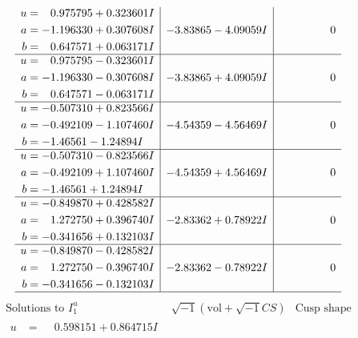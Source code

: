 \documentclass[1p]{elsarticle_modified}
\theoremstyle{definition}
\newcommand{\I}{\sqrt{-1}}
\begin{document}
$$\begin{array}{c|c|c}
\begin{aligned}
u &= \phantom{-}0.975795 + 0.323601 I \\
a &= -1.196330 + 0.307608 I \\
b &= \phantom{-}0.647571 + 0.063171 I\end{aligned}
 & -3.83865 - 4.09059 I & \phantom{-0.000000 } 0 \\ \hline\begin{aligned}
u &= \phantom{-}0.975795 - 0.323601 I \\
a &= -1.196330 - 0.307608 I \\
b &= \phantom{-}0.647571 - 0.063171 I\end{aligned}
 & -3.83865 + 4.09059 I & \phantom{-0.000000 } 0 \\ \hline\begin{aligned}
u &= -0.507310 + 0.823566 I \\
a &= -0.492109 - 1.107460 I \\
b &= -1.46561 - 1.24894 I\end{aligned}
 & -4.54359 - 4.56469 I & \phantom{-0.000000 } 0 \\ \hline\begin{aligned}
u &= -0.507310 - 0.823566 I \\
a &= -0.492109 + 1.107460 I \\
b &= -1.46561 + 1.24894 I\end{aligned}
 & -4.54359 + 4.56469 I & \phantom{-0.000000 } 0 \\ \hline\begin{aligned}
u &= -0.849870 + 0.428582 I \\
a &= \phantom{-}1.272750 + 0.396740 I \\
b &= -0.341656 + 0.132103 I\end{aligned}
 & -2.83362 + 0.78922 I & \phantom{-0.000000 } 0 \\ \hline\begin{aligned}
u &= -0.849870 - 0.428582 I \\
a &= \phantom{-}1.272750 - 0.396740 I \\
b &= -0.341656 - 0.132103 I\end{aligned}
 & -2.83362 - 0.78922 I & \phantom{-0.000000 } 0\\
 \hline 
 \end{array}$$\newpage$$\begin{array}{c|c|c}  
\text{Solutions to }I^u_{1}& \I (\text{vol} + \sqrt{-1}CS) & \text{Cusp shape}\\
 \hline 
\begin{aligned}
u &= \phantom{-}0.598151 + 0.864715 I \\

\end{aligned}
\end{array}$$
\end{document}
